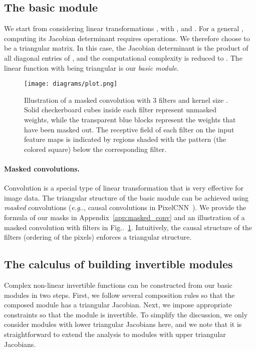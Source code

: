\documentclass{article}
\makeatletter
\def\@onedot{\ifx\@let@token.\else.\null\fi\xspace}
\DeclareRobustCommand\onedot{\futurelet\@let@token\@onedot}
\newcommand{\figref}[1]{Fig\onedot~\ref{#1}}
\def\eg{\emph{e.g}\onedot}
\makeatother
\begin{document}
\subsection{The basic module}\label{sec:basic}
We start from considering linear transformations , with , and . For a general , computing its Jacobian determinant requires  operations. We therefore choose  to be a triangular matrix. In this case, the Jacobian determinant  is the product of all diagonal entries of , and the computational complexity is reduced to . The linear function  with  being triangular is our \emph{basic module}. 





\begin{figure}
    \centering
    \texttt{[image: diagrams/plot.png]}
    \caption{Illustration of a masked convolution with 3 filters and kernel size . Solid checkerboard cubes inside each filter represent unmasked weights, while the transparent blue blocks represent the weights that have been masked out. The receptive field of each filter on the input feature maps is indicated by regions shaded with the pattern (the colored square) below the corresponding filter.}
    \label{fig:masked_conv}
\end{figure}

\paragraph{Masked convolutions.} Convolution is a special type of linear transformation that is very effective for image data. The triangular structure of the basic module can be achieved using \emph{masked} convolutions (\eg, causal convolutions in PixelCNN~\cite{oord2016pixel}). We provide the formula of our masks in Appendix~\ref{app:masked_conv} and  an illustration of a  masked convolution with  filters in \figref{fig:masked_conv}. Intuitively, the causal structure of the filters (ordering of the pixels) enforces a triangular structure.


\subsection{The calculus of building invertible modules}\label{sec:calculus}
Complex non-linear invertible functions can be constructed from our basic modules in two steps. First, we follow several composition rules so that the composed module has a triangular Jacobian. Next, we impose appropriate constraints so that the module is invertible. To simplify the discussion, we only consider modules with lower triangular Jacobians here, and we note that it is straightforward to extend the analysis to modules with upper triangular Jacobians. 
\end{document}
